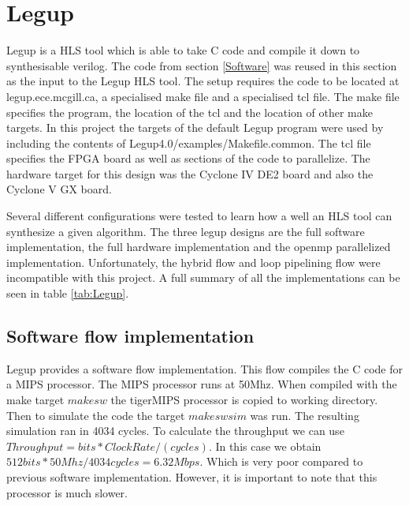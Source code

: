 \documentclass[conference]{IEEEtran}
\begin{document}
\section{Legup} \label{Legup}
Legup is a HLS tool which is able to take C code and compile it down to synthesisable verilog. The code from section \ref{Software} was reused in this section as the input to the Legup HLS tool. The setup requires the code to be located at legup.ece.mcgill.ca, a specialised make file and a specialised tcl file. The make file specifies the program, the location of the tcl and the location of other make targets. In this project the targets of the default Legup program were used by including the contents of Legup4.0/examples/Makefile.common. The tcl file specifies the FPGA board as well as sections of the code to parallelize. The hardware target for this design was the Cyclone IV DE2 board and also the Cyclone V GX board.  

Several different configurations were tested to learn how a well an HLS tool can synthesize a given algorithm. The three legup designs are the full software implementation, the full hardware implementation and the openmp parallelized implementation. Unfortunately, the hybrid flow and loop pipelining flow were incompatible with this project. A full summary of all the implementations can be seen in table \ref{tab:Legup}.

\subsection{Software flow implementation}
Legup provides a software flow implementation. This flow compiles the C code for a MIPS processor. The MIPS processor runs at 50Mhz. When compiled with the make target $make  sw$ the tigerMIPS processor is copied to working directory. Then to simulate the code the target $make swsim$ was run. The resulting simulation ran in 4034 cycles. To calculate the throughput we can use $Throughput = bits *ClockRate / (cycles)$. In this case we obtain $512 bits * 50Mhz/4034 cycles = 6.32Mbps$. Which is very poor compared to previous software implementation. However, it is important to note that this processor is much slower.
\end{document}

